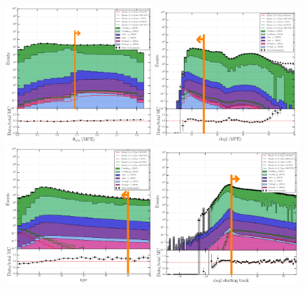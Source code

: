 \begin{figure}[t]
\centering
\includegraphics[width=0.49\textwidth]{chapter8/img/1D_stack_mpefit_zenith.png}
\includegraphics[width=0.49\textwidth]{chapter8/img/1D_stack_mpefit_rlogl.png}
\includegraphics[width=0.49\textwidth]{chapter8/img/L3_zenithcut_gr_1p4835298642_rloglcut_less_15_1D_stack_npe.png}
\includegraphics[width=0.49\textwidth]{chapter8/img/L3_zenithcut_gr_1p4835298642_rloglcut_less_15_npecut_less_50_1D_stack_finitereco_rllh_starting.png}

\end{figure}
